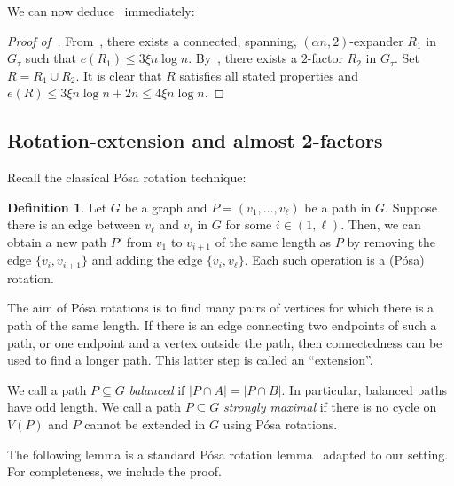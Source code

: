 \documentclass[reqno,final,a4paper]{amsart}
\numberwithin{equation}{section}
\theoremstyle{definition}
\newtheorem{definition}[theorem]{Definition}
\theoremstyle{remark}
\begin{document}
We can now deduce~ immediately:
\begin{proof}[Proof of~]
    From~, there exists a connected, spanning, $(\alpha n,2)$-expander $R_1$ in $G_\tau$ such that $e(R_1)\leq 3\xi n\log n$. By~, there exists a $2$-factor $R_2$ in $G_\tau$. Set $R = R_1\cup R_2$. It is clear that $R$ satisfies all stated properties and $e(R)\leq 3\xi n\log n + 2n \leq 4\xi n\log n$. 
\end{proof}

\subsection{Rotation-extension and almost 2-factors}\label{subsec:rotation-extension}
Recall the classical P\'{o}sa rotation technique:
\begin{definition}
    Let $G$ be a graph and $P = (v_1,\dots, v_\ell)$ be a path in $G$. Suppose there is an edge between $v_\ell$ and $v_i$ in $G$ for some $i\in (1,\ell)$. Then, we can obtain a new path $P'$ from $v_1$ to $v_{i+1}$ of the same length as $P$ by removing the edge $\{v_i, v_{i+1}\}$ and adding the edge $\{v_i,v_\ell\}$. Each such operation is a (P\'{o}sa) rotation.
\end{definition}
The aim of P\'{o}sa rotations is to find many pairs of vertices for which there is a path of the same length. If there is an edge connecting two endpoints of such a path, or one endpoint and a vertex outside the path, then connectedness can be used to find a longer path. This latter step is called an ``extension''.

We call a path $P\subseteq G$ \emph{balanced} if $|P\cap A| = |P\cap B|$. In particular, balanced paths have odd length. We call a path $P\subseteq G$ \emph{strongly maximal} if there is no cycle on $V(P)$ and $P$ cannot be extended in $G$ using P\'{o}sa rotations. 

The following lemma is a standard P\'{o}sa rotation lemma~\cite{Posa} adapted to our setting. For completeness, we include the proof.
\end{document}
